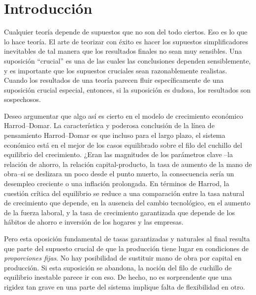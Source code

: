 \section{Introducción}
Cualquier teoría depende de supuestos que no son del todo ciertos. Eso es lo que lo hace teoría. El arte de teorizar con éxito es hacer los supuestos simplificadores inevitables de tal manera que los resultados finales no sean muy sensibles. Una suposición ``crucial'' es una de las cuales las conclusiones dependen sensiblemente, y es importante
que los supuestos cruciales sean razonablemente realistas. Cuando los resultados de una teoría parecen fluir específicamente de una suposición crucial especial, entonces, si la suposición es dudosa, los resultados son sospechosos.

Deseo argumentar que algo así es cierto en el modelo de crecimiento económico Harrod--Domar. La característica y poderosa conclusión de la línea de pensamiento Harrod--Domar es que incluso para el largo plazo, el sistema económico está en el mejor de los casos equilibrado sobre el filo del cuchillo del equilibrio del crecimiento. ¿Eran las magnitudes de los parámetros clave --la relación de ahorro, la relación capital-producto, la tasa de aumento de la mano de obra--si se deslizara un poco desde el punto muerto, la consecuencia sería un desempleo creciente o una inflación prolongada. En términos de Harrod, la cuestión crítica del equilibrio se reduce a una comparación entre la tasa natural de crecimiento que depende, en la ausencia del cambio tecnológico, en el aumento de la fuerza laboral, y la tasa de crecimiento garantizada que depende de los hábitos de ahorro e inversión de los hogares y las empresas.

Pero esta oposición fundamental de tasas garantizadas y naturales al final resulta que parte del supuesto crucial de que la producción tiene lugar en condiciones de \emph{proporciones fijas}. No hay posibilidad de sustituir mano de obra por capital en producción. Si esta suposición se abandona, la noción del filo de cuchillo de equilibrio inestable parece ir con eso. De hecho, no es sorprendente que una rigidez tan grave en una parte del sistema implique falta de flexibilidad en otro.

